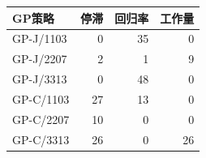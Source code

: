\begin{tabular}{@{}lrrr@{}}
\toprule
GP策略 & 停滞 & 回归率 & 工作量 \\ \midrule
GP-J/1103 & 0 & 35 & 0 \\
GP-J/2207 & 2 & 1 & 9 \\
GP-J/3313 & 0 & 48 & 0 \\
GP-C/1103 & 27 & 13 & 0 \\
GP-C/2207 & 10 & 0 & 0 \\
GP-C/3313 & 26 & 0 & 26 \\
\bottomrule
\end{tabular}
